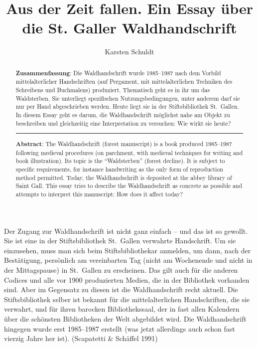 \documentclass[a4paper,
fontsize=11pt,
oneside,
numbers=noperiodatend,
parskip=half-,
bibliography=totoc,
final
]{scrartcl}
\title{\LARGE{Aus der Zeit fallen. Ein Essay über die St. Galler Waldhandschrift}}%
\author{Karsten Schuldt} %
\date{}
\begin{document}
\maketitle
\thispagestyle{fancyplain} 

\begin{abstract}
\noindent
\textbf{Zusammenfassung}: Die Waldhandschrift wurde 1985--1987 nach dem
Vorbild mittelalterlicher Handschriften (auf Pergament, mit
mittelalterlichen Techniken des Schreibens und Buchmalens) produziert.
Thematisch geht es in ihr um das Waldsterben. Sie unterliegt
spezifischen Nutzungsbedingungen, unter anderem darf sie nur per Hand
abgeschrieben werden. Heute liegt sie in der Stiftsbibliothek
St.~Gallen. In diesem Essay geht es darum, die Waldhandschrift möglichst
nahe am Objekt zu beschreiben und gleichzeitig eine Interpretation zu
versuchen: Wie wirkt sie heute?

\begin{center}\rule{0.5\linewidth}{0.5pt}\end{center}

\noindent
\textbf{Abstract}: The Waldhandschrift (forest manuscript) is a book
produced 1985--1987 following medieval procedures (on parchment, with
medieval techniques for writing and book illustration). Its topic is the
“Waldsterben” (forest decline). It is subject to specific
requirements, for instance handwriting as the only form of reproduction
method permitted. Today, the Waldhandschrift is deposited at the abbey
library of Saint Gall. This essay tries to describe the Waldhandschrift
as concrete as possible and attempts to interpret this manuscript: How
does it affect today?
\end{abstract}

Der Zugang zur Waldhandschrift ist nicht ganz einfach -- und das ist so
gewollt. Sie ist eine in der Stiftsbibliothek St.~Gallen verwahrte
Handschrift. Um sie einzusehen, muss man sich beim Stiftsbibliothekar
anmelden, um dann, nach der Bestätigung, persönlich am vereinbarten Tag
(nicht am Wochenende und nicht in der Mittagspause) in St.~Gallen zu
erscheinen. Das gilt auch für die anderen Codices und alle vor 1900
produzierten Medien, die in der Bibliothek vorhanden sind. Aber im
Gegensatz zu diesen ist die Waldhandschrift recht aktuell. Die
Stiftsbibliothek selber ist bekannt für die mittelalterlichen
Handschriften, die sie verwahrt, und für ihren barocken Bibliothekssaal,
der in fast allen Kalendern über die schönsten Bibliotheken der Welt
abgebildet wird. Die Waldhandschrift hingegen wurde erst 1985--1987
erstellt (was jetzt allerdings auch schon fast vierzig Jahre her ist).
(Scapatetti \& Schäffel 1991)
\end{document}
